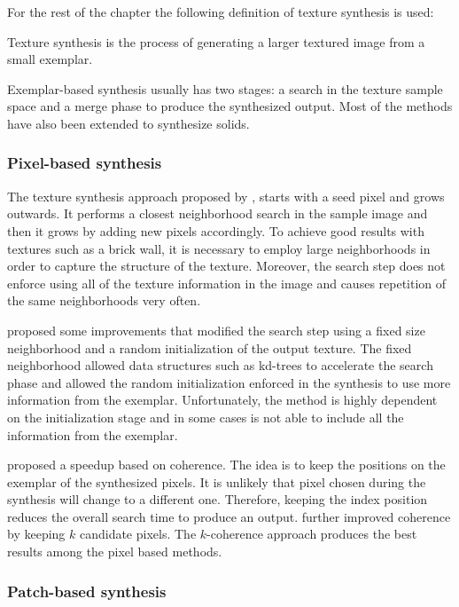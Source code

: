 For the rest of the chapter the following definition of texture synthesis is used:

\begin{definition}
 Texture synthesis is the process of generating a larger textured image from a small exemplar.
\end{definition}

Exemplar-based synthesis usually has two stages: 
a search in the texture sample space and a merge phase to produce the 
synthesized output. Most of the methods have also been extended to
synthesize solids.

\subsubsection{Pixel-based synthesis}

The texture synthesis approach proposed by \cite{efros1999texture}, 
starts with a seed pixel and 
grows outwards. 
It performs a closest neighborhood 
search in the sample image
and then it grows by adding new pixels accordingly. 
To achieve good results with textures such as a brick wall,
it is necessary to employ large neighborhoods in order to capture 
the structure of the texture. 
Moreover, the search step does not enforce using
all of the texture information in the image and causes 
repetition of the same neighborhoods very often.

\cite{wei2000fast} proposed some improvements that modified
the search step using a fixed size neighborhood and a random initialization of the output texture. 
The fixed neighborhood allowed data structures such as kd-trees to accelerate the search phase and
allowed the random initialization enforced in the synthesis to use 
more information from the exemplar. 
Unfortunately, the method is highly dependent on 
the initialization stage and in some cases is not able to 
include all the information from the exemplar. 

\cite{ashikhmin2001synthesizing} proposed 
a speedup based on coherence. The idea is to keep
the positions on the exemplar of the synthesized pixels.
It is unlikely that pixel chosen during the synthesis 
will change to a different one.
Therefore, keeping the index position reduces the overall search time to produce an output. 
\cite{tong2002synthesis} further improved coherence by 
keeping $k$ candidate pixels. The $k$-coherence approach produces the best results among
the pixel based methods. 


\subsubsection{Patch-based synthesis}

